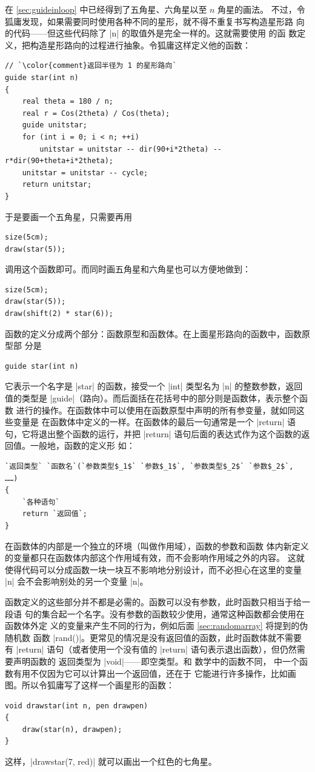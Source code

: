 在 \autoref{sec:guideinloop} 中已经得到了五角星、六角星以至 $n$ 角星的画法。
不过，令狐庸发现，如果需要同时使用各种不同的星形，就不得不重复书写构造星形路
向的代码——但这些代码除了 |n| 的取值外是完全一样的。这就需要使用 \Asy{} 的函
数定义，把构造星形路向的过程进行抽象。令狐庸这样定义他的函数：
\begin{lstlisting}
// `\color{comment}返回半径为 1 的星形路向`
guide star(int n)
{
    real theta = 180 / n;
    real r = Cos(2theta) / Cos(theta);
    guide unitstar;
    for (int i = 0; i < n; ++i)
        unitstar = unitstar -- dir(90+i*2theta) -- r*dir(90+theta+i*2theta);
    unitstar = unitstar -- cycle;
    return unitstar;
}
\end{lstlisting}
于是要画一个五角星，只需要再用
\begin{lstlisting}
size(5cm);
draw(star(5));
\end{lstlisting}
调用这个函数即可。而同时画五角星和六角星也可以方便地做到：
\begin{lstlisting}
size(5cm);
draw(star(5));
draw(shift(2) * star(6));
\end{lstlisting}

函数的定义分成两个部分：函数原型和函数体。在上面星形路向的函数中，函数原型部
分是
\begin{lstlisting}
guide star(int n)
\end{lstlisting}
它表示一个名字是 |star| 的函数，接受一个 |int| 类型名为 |n| 的整数参数，返回
值的类型是 |guide|（路向）。而后面括在花括号中的部分则是函数体，表示整个函数
进行的操作。在函数体中可以使用在函数原型中声明的所有参变量，就如同这些变量是
在函数体中定义的一样。在函数体的最后一句通常是一个 |return|
 语句，它将退出整个函数的运行，并把 |return|
语句后面的表达式作为这个函数的返回值。一般地，函数的定义形
如：
\begin{lstlisting}
`返回类型` `函数名`(`参数类型$_1$` `参数$_1$`, `参数类型$_2$` `参数$_2$`, ……)
{
    `各种语句`
    return `返回值`;
}
\end{lstlisting}
在函数体的内部是一个独立的环境（叫做作用域），函数的参数和函数
体内新定义的变量都只在函数体内部这个作用域有效，而不会影响作用域之外的内容。
这就使得代码可以分成函数一块一块互不影响地分别设计，而不必担心在这里的变量
|n| 会不会影响别处的另一个变量 |n|。

函数定义的这些部分并不都是必需的。函数可以没有参数，此时函数只相当于给一段语
句的集合起一个名字。没有参数的函数较少使用，通常这种函数都会使用在函数体外定
义的变量来产生不同的行为，例如后面 \autoref{sec:randomarray} 将提到的伪随机数
函数 |rand()|。更常见的情况是没有返回值的函数，此时函数体就不需要有 |return|
语句（或者使用一个没有值的 |return| 语句表示退出函数），但仍然需要声明函数的
返回类型为 |void|——即空类型。和
数学中的函数不同，\Asy{} 中一个函数有用不仅因为它可以计算出一个返回值，还在于
它能进行许多操作，比如画图。所以令狐庸写了这样一个画星形的函数：
\begin{lstlisting}
void drawstar(int n, pen drawpen)
{
    draw(star(n), drawpen);
}
\end{lstlisting}
这样，|drawstar(7, red)| 就可以画出一个红色的七角星。

